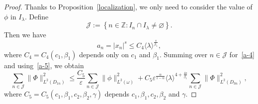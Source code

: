 \documentclass{amsart}
\newcommand\Z{\ensuremath{\mathbb{Z}}}
\theoremstyle{definition}
\begin{document}
\begin{proof}
	Thanks to Proposition~\ref{localization}, we only need to consider the value of $\phi$ in $I_\lambda$. Define
	\begin{equation}
		\mathcal{J}:=\left\{n\in \Z: I_{n}\cap I_\lambda\neq \varnothing\right\}. 
	\end{equation}
	Then we have
	\begin{equation}
		a_n=|x_n|^{s}\le C_4\langle \lambda\rangle ^{\frac{s}{\beta_1}},\label{a-5}
	\end{equation}
	where $C_4=C_4(c_1,\beta_1)$ depends only on $c_1$ and $\beta_1$.
Summing over $n \in \mathcal{J}$ for~\eqref{a-4}  and using~\eqref{a-5}, we obtain
\begin{equation}\label{a-8}
	\sum_{n\in \mathcal{J}}\|\Phi\|^2_{L^{2}(D_{1n})}\le \frac{C_5}{\varepsilon }\sum_{n\in \mathcal{J}}\|\phi\|^2_{L^2(\omega)}+C_5\varepsilon ^{\frac{\alpha}{1-\alpha}}\langle \lambda\rangle ^{4+\frac{4s}{\beta_1}}\sum_{n\in \mathcal{J}}\|\Phi\|^2_{L^2(D_{3n})},
\end{equation}
where $C_5=C_5(c_1,\beta_1,c_2,\beta_2,\gamma)$ depends $c_1,\beta_1,c_2,\beta_2$ and $\gamma$.


\end{proof}
\end{document}
